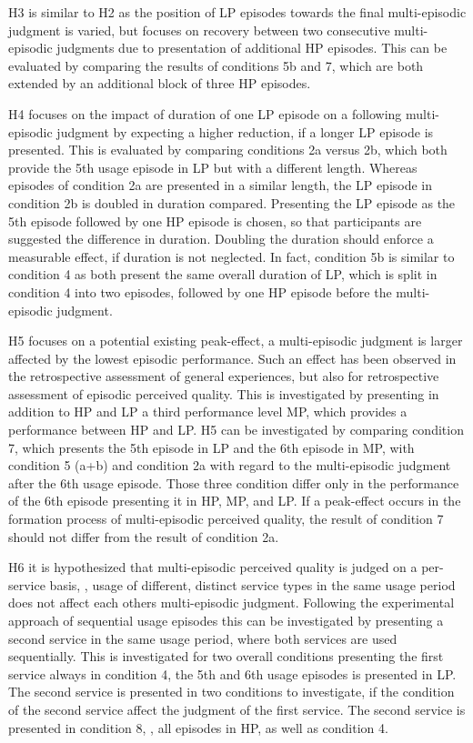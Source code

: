 H3 is similar to H2 as the position of \ac{LP} episodes towards the final multi-episodic judgment is varied, but focuses on recovery between two consecutive multi-episodic judgments due to presentation of additional \ac{HP} episodes.
This can be evaluated by comparing the results of conditions 5b and 7, which are both extended by an additional block of three \ac{HP} episodes.

H4 focuses on the impact of duration of one \ac{LP} episode on a following multi-episodic judgment by expecting a higher reduction, if a longer \ac{LP} episode is presented.
This is evaluated by comparing conditions 2a versus 2b, which both provide the 5th usage episode in \ac{LP} but with a different length.
Whereas episodes of condition 2a are presented in a similar length, the \ac{LP} episode in condition 2b is doubled in duration compared.
Presenting the \ac{LP} episode as the 5th episode followed by one \ac{HP} episode is chosen, so that participants are suggested the difference in duration.
Doubling the duration should enforce a measurable effect, if duration is not neglected.
In fact, condition 5b is similar to condition 4 as both present the same overall duration of \ac{LP}, which is split in condition 4 into two episodes, followed by one \ac{HP} episode before the multi-episodic judgment.

H5 focuses on a potential existing peak-effect, \ie a multi-episodic judgment is larger affected by the lowest episodic performance. 
Such an effect has been observed in the retrospective assessment of general experiences, but also for retrospective assessment of episodic perceived quality.
This is investigated by presenting in addition to \ac{HP} and \ac{LP} a third performance level \ac{MP}, which provides a performance between \ac{HP} and \ac{LP}.
H5 can be investigated by comparing condition 7, which presents the 5th episode in \ac{LP} and the 6th episode in \ac{MP}, with condition 5 (a+b) and condition 2a with regard to the multi-episodic judgment after the 6th usage episode.
Those three condition differ only in the performance of the 6th episode presenting it in \ac{HP}, \ac{MP}, and \ac{LP}.
If a peak-effect occurs in the formation process of multi-episodic perceived quality, the result of condition 7 should not differ from the result of condition 2a.

H6 it is hypothesized that multi-episodic perceived quality is judged on a per-service basis, \ie, usage of different, distinct service types in the same usage period does not affect each others multi-episodic judgment.
Following the experimental approach of sequential usage episodes this can be investigated by presenting a second service in the same usage period, where both services are used sequentially.
This is investigated for two overall conditions presenting the first service always in condition 4, \ie the 5th and 6th usage episodes is presented in \ac{LP}.
The second service is presented in two conditions to investigate, if the condition of the second service affect the judgment of the first service.
The second service is presented in condition 8, \ie, all episodes in \ac{HP}, as well as condition 4.


